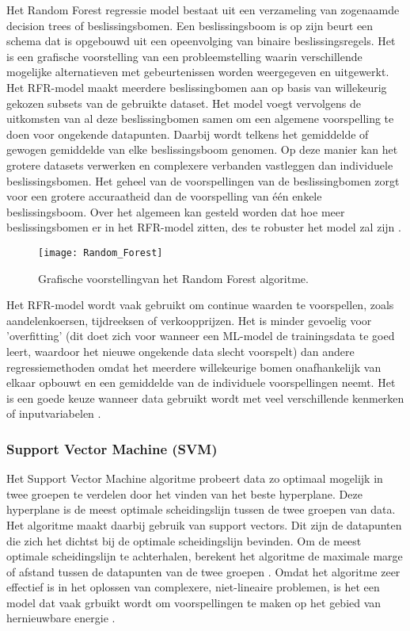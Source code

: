 Het Random Forest regressie model bestaat uit een verzameling van zogenaamde decision trees of beslissingsbomen. Een beslissingsboom is op zijn beurt een schema dat is opgebouwd uit een opeenvolging van binaire beslissingsregels. Het is een grafische voorstelling van een probleemstelling waarin verschillende mogelijke alternatieven met gebeurtenissen worden weergegeven en uitgewerkt. Het RFR-model maakt meerdere beslissingbomen aan op basis van willekeurig gekozen subsets van de gebruikte dataset. Het model voegt vervolgens de uitkomsten van al deze beslissingbomen samen om een algemene voorspelling te doen voor ongekende datapunten. Daarbij wordt telkens het gemiddelde of gewogen gemiddelde van elke beslissingsboom genomen. Op deze manier kan het grotere datasets verwerken en complexere verbanden vastleggen dan individuele beslissingsbomen. Het geheel van de voorspellingen van de beslissingbomen zorgt voor een grotere accuraatheid dan de voorspelling van één enkele beslissingsboom. Over het algemeen kan gesteld worden dat hoe meer beslissingsbomen er in het RFR-model zitten, des te robuster het model zal zijn \autocite{Balakumar2023}. \\

\begin{figure}[h!]
    \centering\texttt{[image: Random\_Forest]}
    \caption{\label{fig:Random_Forest}Grafische voorstellingvan het Random Forest algoritme.}
\end{figure} 

Het RFR-model wordt vaak gebruikt om continue waarden te voorspellen, zoals aandelenkoersen, tijdreeksen of verkoopprijzen. Het is minder gevoelig voor 'overfitting' (dit doet zich voor wanneer een ML-model de trainingsdata te goed leert, waardoor het nieuwe ongekende data slecht voorspelt) dan andere regressiemethoden omdat het meerdere willekeurige bomen onafhankelijk van elkaar opbouwt en een gemiddelde van de individuele voorspellingen neemt. Het is een goede keuze wanneer data gebruikt wordt met veel verschillende kenmerken of inputvariabelen  \autocite{Sahai2023}.

\subsubsection{Support Vector Machine (SVM)}

Het Support Vector Machine algoritme probeert data zo optimaal mogelijk in twee groepen te verdelen door het vinden van het beste hyperplane. Deze hyperplane is de meest optimale scheidingslijn tussen de twee groepen van data. Het algoritme maakt daarbij gebruik van support vectors. Dit zijn de datapunten die zich het dichtst bij de optimale scheidingslijn bevinden. Om de meest optimale scheidingslijn te achterhalen, berekent het algoritme de maximale marge of afstand tussen de datapunten van de twee groepen  \autocite{Tziolis2024}. Omdat het algoritme zeer effectief is in het oplossen van complexere, niet-lineaire problemen, is het een model dat vaak grbuikt wordt om voorspellingen te maken op het gebied van hernieuwbare energie \autocite{Ahmad2018}. \\

